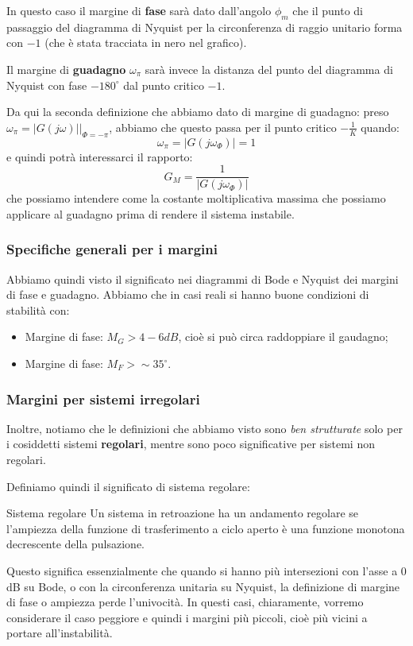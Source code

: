 \documentclass[a4paper,11pt]{article}
\begin{document}
In questo caso il margine di \textbf{fase} sarà dato dall'angolo $\phi_m$ che il punto di passaggio del diagramma di Nyquist per la circonferenza di raggio unitario forma con $-1$ (che è stata tracciata in nero nel grafico).

Il margine di \textbf{guadagno} $\omega_\pi$ sarà invece la distanza del punto del diagramma di Nyquist con fase $-180^\circ$ dal punto critico $-1$.

Da qui la seconda definizione che abbiamo dato di margine di guadagno: preso $\omega_\pi = |G(j \omega)| \big|_{\Phi = -\pi}$, abbiamo che questo passa per il punto critico $-\frac{1}{K}$ quando:
$$
\omega_\pi = |G(j\omega_\Phi)| = 1 
$$
e quindi potrà interessarci il rapporto:
$$
G_M = \frac{1}{|G(j\omega_\Phi)|}
$$
che possiamo intendere come la costante moltiplicativa massima che possiamo applicare al guadagno prima di rendere il sistema instabile.

\subsubsection{Specifiche generali per i margini}

Abbiamo quindi visto il significato nei diagrammi di Bode e Nyquist dei margini di fase e guadagno.
Abbiamo che in casi reali si hanno buone condizioni di stabilità con:
\begin{itemize}
	\item Margine di fase: $M_G > 4 - 6 dB$, cioè si può circa raddoppiare il gaudagno;
	\item Margine di fase: $M_F > \sim 35^\circ$.
\end{itemize}

\subsubsection{Margini per sistemi irregolari}
Inoltre, notiamo che le definizioni che abbiamo visto sono \textit{ben strutturate} solo per i cosiddetti sistemi \textbf{regolari}, mentre sono poco significative per sistemi non regolari.

Definiamo quindi il significato di sistema regolare:
\begin{definition}{Sistema regolare}
	Un sistema in retroazione ha un andamento regolare se l'ampiezza della funzione di trasferimento a ciclo aperto è una funzione monotona decrescente della pulsazione.
\end{definition}

Questo significa essenzialmente che quando si hanno più intersezioni con l'asse a 0 dB su Bode, o con la circonferenza unitaria su Nyquist, la definizione di margine di fase o ampiezza perde l'univocità.
In questi casi, chiaramente, vorremo considerare il caso peggiore e quindi i margini più piccoli, cioè più vicini a portare all'instabilità.
\end{document}
